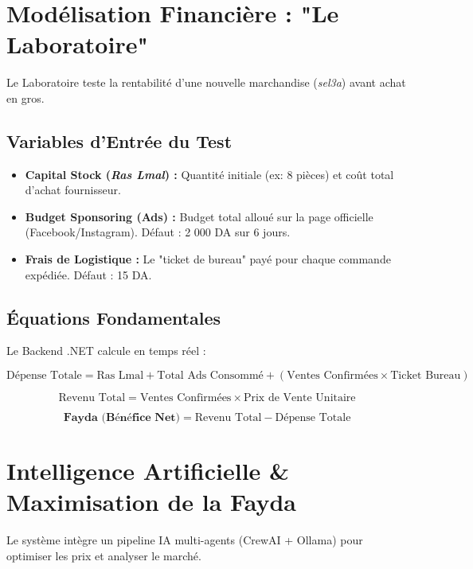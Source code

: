 \documentclass[11pt,a4paper]{article}
\begin{document}
\section{Modélisation Financière : "Le Laboratoire"}

Le Laboratoire teste la rentabilité d'une nouvelle marchandise (\textit{sel3a}) avant achat en gros.

\subsection{Variables d'Entrée du Test}
\begin{itemize}
    \item \textbf{Capital Stock (\textit{Ras Lmal}) :} Quantité initiale (ex: 8 pièces) et coût total d'achat fournisseur.
    \item \textbf{Budget Sponsoring (Ads) :} Budget total alloué sur la page officielle (Facebook/Instagram). Défaut : 2 000 DA sur 6 jours.
    \item \textbf{Frais de Logistique :} Le "ticket de bureau" payé pour chaque commande expédiée. Défaut : 15 DA.
\end{itemize}

\subsection{Équations Fondamentales}
Le Backend .NET calcule en temps réel :

\begin{equation}
    \text{Dépense Totale} = \text{Ras Lmal} + \text{Total Ads Consommé} + (\text{Ventes Confirmées} \times \text{Ticket Bureau})
\end{equation}

\begin{equation}
    \text{Revenu Total} = \text{Ventes Confirmées} \times \text{Prix de Vente Unitaire}
\end{equation}

\begin{equation}
    \textbf{Fayda (Bénéfice Net)} = \text{Revenu Total} - \text{Dépense Totale}
\end{equation}

\section{Intelligence Artificielle \& Maximisation de la Fayda}

Le système intègre un pipeline IA multi-agents (CrewAI + Ollama) pour optimiser les prix et analyser le marché.
\end{document}
